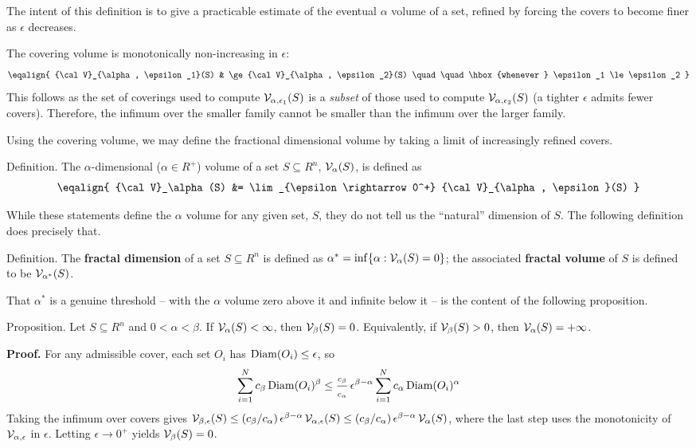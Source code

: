 The intent of this definition is to give a practicable estimate of
the eventual $\alpha$ volume of a set, refined by forcing the covers to
become finer as $\epsilon$ decreases.

The covering volume is monotonically non-increasing in $\epsilon$:
$$
\eqalign{
	{\cal V}_{\alpha, \epsilon_1}(S) & \ge {\cal V}_{\alpha, \epsilon_2}(S) \quad \quad \hbox{whenever  } \epsilon_1 \le \epsilon_2
}
$$
This follows as the set of coverings used to compute
${\cal V}_{\alpha, \epsilon_1}(S)$ is a {\it subset\/} of those used to
compute ${\cal V}_{\alpha, \epsilon_2}(S)$ (a tighter $\epsilon$ admits
fewer covers). Therefore, the infimum over the smaller family cannot be
smaller than the infimum over the larger family.

Using the covering volume, we may define the fractional dimensional volume by
taking a limit of increasingly refined covers.

\proclaim Definition. The $\alpha$-dimensional ($\alpha \in R^{+}$)
volume of a set $S \subseteq R^n$, ${\cal V}_\alpha(S)$,
is defined as
$$
\eqalign{
	{\cal V}_\alpha(S) &= \lim_{\epsilon \rightarrow 0^+} {\cal V}_{\alpha, \epsilon}(S)
}
$$

While these statements define the $\alpha$ volume for any given set, $S$,
they do not tell us the ``natural'' dimension of $S$.
The following definition does precisely that.

\proclaim Definition. The {\bf fractal dimension} of a
set $S \subseteq R^n$ is defined as
$\alpha^* = \inf\{\alpha : {\cal V}_\alpha(S) = 0 \}$; the associated
{\bf fractal volume} of $S$ is defined to be ${\cal V}_{\alpha^*}(S)$.

That $\alpha^*$ is a genuine threshold -- with the $\alpha$ volume zero
above it and infinite below it -- is the content of the following
proposition.

\proclaim Proposition. Let $S \subseteq R^n$ and $0 < \alpha < \beta$. If
${\cal V}_\alpha(S) < \infty$, then ${\cal V}_\beta(S) = 0$. Equivalently,
if ${\cal V}_\beta(S) > 0$, then ${\cal V}_\alpha(S) = +\infty$.

{\bf Proof.} For any admissible cover, each set $O_i$ has
${\rm Diam}(O_i) \le \epsilon$, so
$$
\sum_{i=1}^N c_\beta \, {\rm Diam}(O_i)^\beta \le
\frac{c_\beta}{c_\alpha} \, \epsilon^{\beta - \alpha}
\sum_{i=1}^N c_\alpha \, {\rm Diam}(O_i)^\alpha
$$
Taking the infimum over covers gives
${\cal V}_{\beta, \epsilon}(S) \le (c_\beta / c_\alpha) \,
\epsilon^{\beta - \alpha} \, {\cal V}_{\alpha, \epsilon}(S) \le
(c_\beta / c_\alpha) \, \epsilon^{\beta - \alpha} \, {\cal V}_\alpha(S)$,
where the last step uses the monotonicity of ${\cal V}_{\alpha, \epsilon}$
in $\epsilon$. Letting $\epsilon \rightarrow 0^+$ yields
${\cal V}_\beta(S) = 0$.

